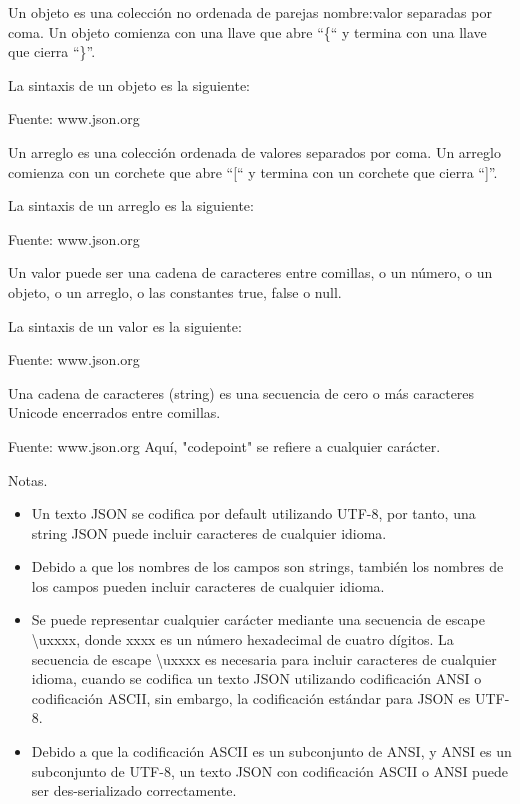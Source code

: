 Un objeto es una colección no ordenada de parejas nombre:valor separadas por coma. Un objeto comienza con una llave que abre “\{“ y termina con una llave que cierra “\}”.

\begin{SourceCode}
La sintaxis de un objeto es la siguiente:

Fuente: www.json.org
\end{SourceCode}

Un arreglo es una colección ordenada de valores separados por coma. Un arreglo comienza con un corchete que abre “[“ y termina con un corchete que cierra “]”.

\begin{SourceCode}
La sintaxis de un arreglo es la siguiente:

Fuente: www.json.org
\end{SourceCode}

Un valor puede ser una cadena de caracteres entre comillas, o un número, o un objeto, o un arreglo, o las constantes true, false o null.

\begin{SourceCode}
La sintaxis de un valor es la siguiente:

Fuente: www.json.org
\end{SourceCode}

Una cadena de caracteres (string) es una secuencia de cero o más caracteres Unicode encerrados entre comillas.

\begin{SourceCode}
Fuente: www.json.org
Aquí, "codepoint" se refiere a cualquier carácter.
\end{SourceCode}

Notas.

\begin{itemize}
\item Un texto JSON se codifica por default utilizando UTF-8, por tanto, una string JSON puede incluir caracteres de cualquier idioma.
\item Debido a que los nombres de los campos son strings, también los nombres de los campos pueden incluir caracteres de cualquier idioma.
\item Se puede representar cualquier carácter mediante una secuencia de escape \textbackslash{}uxxxx, donde xxxx es un número hexadecimal de cuatro dígitos. La secuencia de escape \textbackslash{}uxxxx es necesaria para incluir caracteres de cualquier idioma, cuando se codifica un texto JSON utilizando codificación ANSI o codificación ASCII, sin embargo, la codificación estándar para JSON es UTF-8.
\item Debido a que la codificación ASCII es un subconjunto de ANSI, y ANSI es un subconjunto de UTF-8, un texto JSON con codificación ASCII o ANSI puede ser des-serializado correctamente.
\end{itemize}

